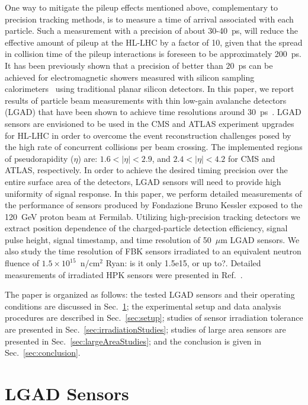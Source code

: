 \documentclass[preprint,1p]{elsarticle}
\begin{document}
One way to mitigate the pileup effects mentioned above, complementary to
precision tracking methods, is to measure a time of arrival associated with each
particle. Such a measurement with a precision of about 30-40~\si{ps}, will
reduce the effective amount of pileup at the HL-LHC by a factor of 10, given
that the spread in collision time of the pileup interactions  is foreseen to be
approximately 200~\si{ps}. It has been previously shown that a precision of
better than $20$~\si{ps} can be achieved for electromagnetic showers measured
with silicon sampling
calorimeters~\cite{Apresyan201662,Apresyan2017_NSSMIC,AKCHURIN201731} using
traditional planar silicon detectors. In this paper, we report results of
particle beam measurements with thin low-gain avalanche detectors (LGAD) that
have been shown to achieve time resolutions around
30~\si{ps}~\cite{Cartiglia201783, PELLEGRINI201412}. LGAD sensors are envisioned to be
used in the CMS and ATLAS experiment upgrades for HL-LHC in order to overcome
the event reconstruction challenges posed by the high rate of concurrent
collisions per beam crossing. The implemented regions of pseudorapidity ($\eta$)
are: $1.6 < |\eta| < 2.9$, and $2.4 < |\eta| < 4.2 $ for CMS and ATLAS,
respectively. In order to achieve the desired timing precision over the entire
surface area of the detectors, LGAD sensors will need to provide high uniformity
of signal response. In this paper, we perform detailed measurements of the
performance of sensors produced by Fondazione Bruno Kessler exposed to the
120~GeV proton beam at Fermilab. Utilizing high-precision tracking detectors we
extract position dependence of the charged-particle detection efficiency, signal
pulse height, signal timestamp, and time resolution of 50~$\mu$m LGAD sensors.
We also study the time resolution of FBK sensors irradiated to an equivalent
neutron fluence of $1.5\times 10^{15}$~n/cm$^2$ {\color{red} Ryan: is it only 1.5e15, or up to?}. Detailed measurements of
irradiated HPK sensors were presented in Ref.~\cite{Galloway:2017gfx}.

The paper is organized as follows: the tested LGAD sensors and
their operating conditions are discussed in Sec.~\ref{sec:sensors};
the experimental setup and data analysis
procedures are described in Sec.~\ref{sec:setup}; 
studies of sensor irradiation tolerance are presented in 
Sec.~\ref{sec:irradiationStudies}; studies of large area sensors are presented 
in Sec.~\ref{sec:largeAreaStudies}; and the conclusion is given in Sec.~\ref{sec:conclusion}.


\section{LGAD Sensors}
\label{sec:sensors}
\end{document}
